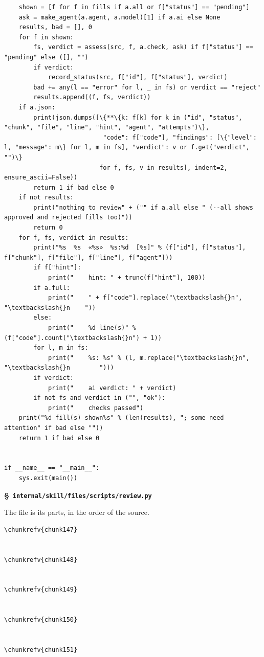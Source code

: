 \documentclass[10pt,a4paper]{article}
\makeatletter
\newcounter{chunk}
\renewcommand{\thechunk}{\S\arabic{chunk}}
\newcommand{\chunkhead}[2]{\par\addvspace{1.2ex}\noindent\refstepcounter{chunk}\label{#1}{\bfseries\thechunk}\enspace #2\par\nopagebreak}
\newcommand{\chunkrefv}[1]{\hyperref[#1]{\ensuremath{\langle}\csname cn@#1\endcsname\ensuremath{\rangle}\textsuperscript{\ref*{#1}}}}
\newcommand{\filebadge}{{\footnotesize\itshape\color{tuftegray}file}}
\makeatother
\begin{document}
\begin{Verbatim}
    shown = [f for f in fills if a.all or f["status"] == "pending"]
    ask = make_agent(a.agent, a.model)[1] if a.ai else None
    results, bad = [], 0
    for f in shown:
        fs, verdict = assess(src, f, a.check, ask) if f["status"] == "pending" else ([], "")
        if verdict:
            record_status(src, f["id"], f["status"], verdict)
        bad += any(l == "error" for l, _ in fs) or verdict == "reject"
        results.append((f, fs, verdict))
    if a.json:
        print(json.dumps([\{**\{k: f[k] for k in ("id", "status", "chunk", "file", "line", "hint", "agent", "attempts")\},
                           "code": f["code"], "findings": [\{"level": l, "message": m\} for l, m in fs], "verdict": v or f.get("verdict", "")\}
                          for f, fs, v in results], indent=2, ensure_ascii=False))
        return 1 if bad else 0
    if not results:
        print("nothing to review" + ("" if a.all else " (--all shows approved and rejected fills too)"))
        return 0
    for f, fs, verdict in results:
        print("%s  %s  «%s»  %s:%d  [%s]" % (f["id"], f["status"], f["chunk"], f["file"], f["line"], f["agent"]))
        if f["hint"]:
            print("    hint: " + trunc(f["hint"], 100))
        if a.full:
            print("    " + f["code"].replace("\textbackslash{}n", "\textbackslash{}n    "))
        else:
            print("    %d line(s)" % (f["code"].count("\textbackslash{}n") + 1))
        for l, m in fs:
            print("    %s: %s" % (l, m.replace("\textbackslash{}n", "\textbackslash{}n        ")))
        if verdict:
            print("    ai verdict: " + verdict)
        if not fs and verdict in ("", "ok"):
            print("    checks passed")
    print("%d fill(s) shown%s" % (len(results), "; some need attention" if bad else ""))
    return 1 if bad else 0


if __name__ == "__main__":
    sys.exit(main())
\end{Verbatim}

\chunkhead{chunk152}{\filebadge\ \textbf{\texttt{internal/\allowbreak{}skill/\allowbreak{}files/\allowbreak{}scripts/\allowbreak{}review.\allowbreak{}py}}}
The file is its parts, in the order of the source.
\begin{Verbatim}
\chunkrefv{chunk147}


\chunkrefv{chunk148}


\chunkrefv{chunk149}


\chunkrefv{chunk150}


\chunkrefv{chunk151}
\end{Verbatim}
\end{document}
